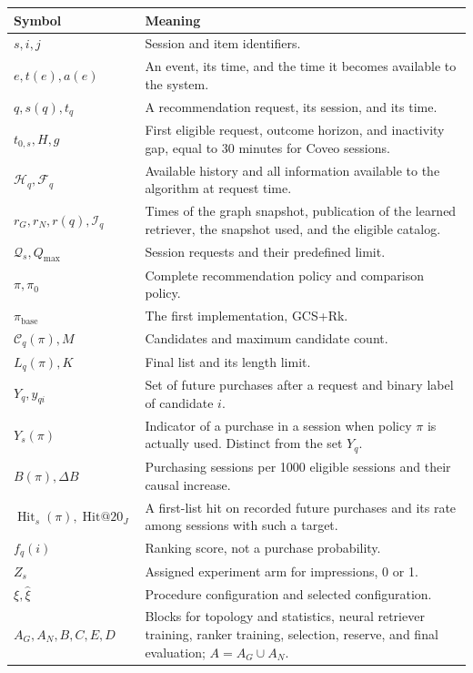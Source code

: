 \documentclass[12pt,a4paper]{article}
\theoremstyle{plainru}
\begin{document}
\small
\begin{longtable}{L{0.23\textwidth}L{0.69\textwidth}}
\toprule Symbol & Meaning \\\midrule\endhead
\(s,i,j\) & Session and item identifiers. \\
\(e,t(e),a(e)\) & An event, its time, and the time it becomes available to the system. \\
\(q,s(q),t_q\) & A recommendation request, its session, and its time. \\
\(t_{0,s},H,g\) & First eligible request, outcome horizon, and inactivity
gap, equal to 30 minutes for Coveo sessions. \\
\(\mathcal H_q,\mathcal F_q\) & Available history and all information
available to the algorithm at request time. \\
\(r_G,r_N,r(q),\mathcal I_q\) & Times of the graph snapshot, publication
of the learned retriever, the snapshot used, and the eligible catalog. \\
\(\mathcal Q_s,Q_{\max}\) & Session requests and their predefined limit. \\
\(\pi,\pi_0\) & Complete recommendation policy and comparison policy. \\
\(\pi_{\mathrm{base}}\) & The first implementation, GCS+Rk. \\
\(\mathcal C_q(\pi),M\) & Candidates and maximum candidate count. \\
\(L_q(\pi),K\) & Final list and its length limit. \\
\(Y_q,y_{qi}\) & Set of future purchases after a request and binary label
of candidate \(i\). \\
\(Y_s(\pi)\) & Indicator of a purchase in a session when policy
\(\pi\) is actually used. Distinct from the set \(Y_q\). \\
\(B(\pi),\Delta B\) & Purchasing sessions per 1000 eligible sessions and their causal increase. \\
\(\operatorname{Hit}_s(\pi),\operatorname{Hit@20}_J\) & A first-list hit
on recorded future purchases and its rate among sessions with such a target. \\
\(f_q(i)\) & Ranking score, not a purchase probability. \\
\(Z_s\) & Assigned experiment arm for impressions, 0 or 1. \\
\(\xi,\widehat\xi\) & Procedure configuration and selected configuration. \\
\(A_G,A_N,B,C,E,D\) & Blocks for topology and statistics, neural retriever
training, ranker training, selection, reserve, and final evaluation;
\(A=A_G\cup A_N\). \\
\bottomrule
\end{longtable}
\normalsize
\end{document}
